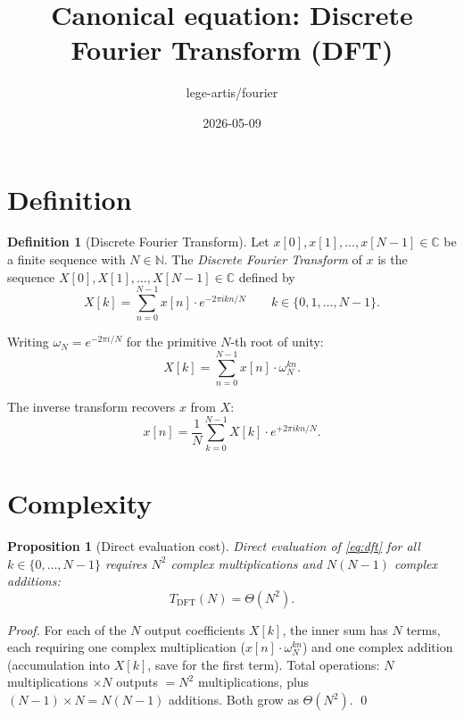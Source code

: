 \documentclass[11pt,a4paper]{article}
\title{Canonical equation: Discrete Fourier Transform (DFT)}
\author{lege-artis/fourier}
\date{2026-05-09}
\theoremstyle{definition}
\newtheorem{definition}{Definition}
\theoremstyle{plain}
\newtheorem{proposition}{Proposition}
\begin{document}
\maketitle

\section{Definition}

\begin{definition}[Discrete Fourier Transform]
\label{def:dft}
Let $x[0], x[1], \ldots, x[N-1] \in \mathbb{C}$ be a finite sequence with $N \in \mathbb{N}$.
The \emph{Discrete Fourier Transform} of $x$ is the sequence $X[0], X[1], \ldots, X[N-1] \in \mathbb{C}$
defined by
\begin{equation}
\label{eq:dft}
X[k] = \sum_{n=0}^{N-1} x[n] \cdot e^{-2\pi i k n / N}
\qquad k \in \{0, 1, \ldots, N-1\}.
\end{equation}
\end{definition}

Writing $\omega_N = e^{-2\pi i / N}$ for the primitive $N$-th root of unity:
\begin{equation}
\label{eq:dft-twiddle}
X[k] = \sum_{n=0}^{N-1} x[n] \cdot \omega_N^{k n}.
\end{equation}

The inverse transform recovers $x$ from $X$:
\begin{equation}
\label{eq:idft}
x[n] = \frac{1}{N} \sum_{k=0}^{N-1} X[k] \cdot e^{+2\pi i k n / N}.
\end{equation}

\section{Complexity}

\begin{proposition}[Direct evaluation cost]
\label{prop:complexity}
Direct evaluation of \eqref{eq:dft} for all $k \in \{0, \ldots, N-1\}$ requires
$N^2$ complex multiplications and $N(N-1)$ complex additions:
\begin{equation}
\label{eq:dft-cost}
T_{\mathrm{DFT}}(N) = \Theta(N^2).
\end{equation}
\end{proposition}

\begin{proof}
For each of the $N$ output coefficients $X[k]$, the inner sum has $N$ terms, each
requiring one complex multiplication ($x[n] \cdot \omega_N^{kn}$) and one complex
addition (accumulation into $X[k]$, save for the first term). Total operations:
$N$ multiplications $\times N$ outputs $= N^2$ multiplications,
plus $(N-1) \times N = N(N-1)$ additions. Both grow as $\Theta(N^2)$.
\qed
\end{proof}
\end{document}
